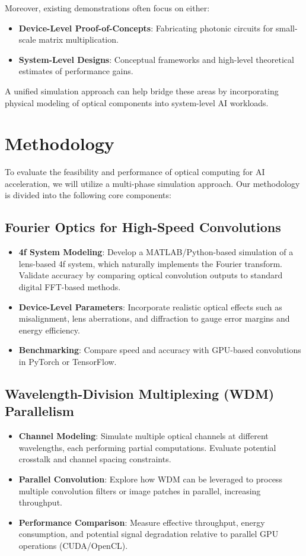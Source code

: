\documentclass[conference]{IEEEtran}
\begin{document}
Moreover, existing demonstrations often focus on either:
\begin{itemize}
    \item \textbf{Device-Level Proof-of-Concepts}: Fabricating photonic circuits for small-scale matrix multiplication.
    \item \textbf{System-Level Designs}: Conceptual frameworks and high-level theoretical estimates of performance gains.
\end{itemize}
A unified simulation approach can help bridge these areas by incorporating physical modeling of optical components into system-level AI workloads.

\section{Methodology}
To evaluate the feasibility and performance of optical computing for AI acceleration, we will utilize a multi-phase simulation approach. Our methodology is divided into the following core components:

\subsection{Fourier Optics for High-Speed Convolutions}
\begin{itemize}
    \item \textbf{4f System Modeling}: Develop a MATLAB/Python-based simulation of a lens-based 4f system, which naturally implements the Fourier transform. Validate accuracy by comparing optical convolution outputs to standard digital FFT-based methods.
    \item \textbf{Device-Level Parameters}: Incorporate realistic optical effects such as misalignment, lens aberrations, and diffraction to gauge error margins and energy efficiency.
    \item \textbf{Benchmarking}: Compare speed and accuracy with GPU-based convolutions in PyTorch or TensorFlow. 
\end{itemize}

\subsection{Wavelength-Division Multiplexing (WDM) Parallelism}
\begin{itemize}
    \item \textbf{Channel Modeling}: Simulate multiple optical channels at different wavelengths, each performing partial computations. Evaluate potential crosstalk and channel spacing constraints.
    \item \textbf{Parallel Convolution}: Explore how WDM can be leveraged to process multiple convolution filters or image patches in parallel, increasing throughput.
    \item \textbf{Performance Comparison}: Measure effective throughput, energy consumption, and potential signal degradation relative to parallel GPU operations (CUDA/OpenCL).
\end{itemize}
\end{document}
